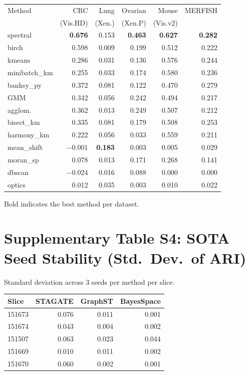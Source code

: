 \documentclass[11pt]{article}
\begin{document}
\begin{small}
\begin{tabular}{@{}lrrrrr@{}}
\toprule
Method & CRC & Lung & Ovarian & Mouse & MERFISH \\
 & (Vis.HD) & (Xen.) & (Xen.P) & (Vis.v2) & \\
\midrule
spectral & \textbf{0.676} & 0.153 & \textbf{0.463} & \textbf{0.627} & \textbf{0.282} \\
birch & 0.598 & 0.009 & 0.199 & 0.512 & 0.222 \\
kmeans & 0.286 & 0.031 & 0.136 & 0.576 & 0.244 \\
minibatch\_km & 0.255 & 0.033 & 0.174 & 0.580 & 0.236 \\
banksy\_py & 0.372 & 0.081 & 0.122 & 0.470 & 0.279 \\
GMM & 0.342 & 0.056 & 0.242 & 0.494 & 0.217 \\
agglom. & 0.362 & 0.013 & 0.249 & 0.507 & 0.212 \\
bisect\_km & 0.335 & 0.081 & 0.179 & 0.508 & 0.253 \\
harmony\_km & 0.222 & 0.056 & 0.033 & 0.559 & 0.211 \\
mean\_shift & $-$0.001 & \textbf{0.183} & 0.003 & 0.005 & 0.029 \\
moran\_sp & 0.078 & 0.013 & 0.171 & 0.268 & 0.141 \\
dbscan & $-$0.024 & 0.016 & 0.088 & 0.000 & 0.000 \\
optics & 0.012 & 0.035 & 0.003 & 0.010 & 0.022 \\
\bottomrule
\end{tabular}
\end{small}

\medskip
\noindent Bold indicates the best method per dataset.

\section*{Supplementary Table S4: SOTA Seed Stability (Std.\ Dev.\ of ARI)}

Standard deviation across 3 seeds per method per slice.

\begin{tabular}{@{}lrrr@{}}
\toprule
Slice & STAGATE & GraphST & BayesSpace \\
\midrule
151673 & 0.076 & 0.011 & 0.001 \\
151674 & 0.043 & 0.004 & 0.002 \\
151507 & 0.063 & 0.023 & 0.044 \\
151669 & 0.010 & 0.011 & 0.002 \\
151670 & 0.060 & 0.002 & 0.001 \\
\bottomrule
\end{tabular}
\end{document}
